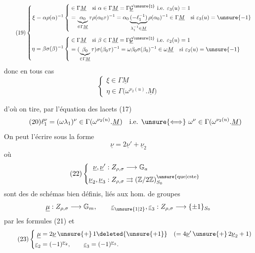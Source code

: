 \[
\tag{19}
\left\{
\begin{aligned}
\xi=\alpha\rho(\alpha)^{-1}
&\left\{
\begin{aligned}
&\in\Gamma\underline M\quad\text{si }\alpha\in\Gamma\underline M=\Gamma\underline{\mathcal G}^{\unsure{\natural}}\ \text{i.e. }\varepsilon_3(u)=1\\
&=\underbrace{\alpha_0}_{\in\Gamma\underline M}\tau\rho(\alpha_0\tau)^{-1}
=\alpha_0\underbrace{(-\ell_1^{-1})}_{\lambda_1^{-1}\in\underline M}\rho(\alpha_0)^{-1}\in\Gamma\underline M\quad\text{si }\varepsilon_3(u)=\unsure{-1}
\end{aligned}\right.\\[1ex]
\eta=\beta\sigma(\beta)^{-1}
&\left\{
\begin{aligned}
&\in\Gamma\underline M\quad\text{si }\beta\in\Gamma\underline M=\Gamma\underline{\mathcal G}^{\unsure{\natural}}\ \text{i.e. }\varepsilon_2(u)=1\\
&=(\underbrace{\beta_0}_{\in\Gamma\underline M}\tau)\sigma(\beta_0\tau)^{-1}
=\omega\beta_0\sigma(\beta_0)^{-1}\in\omega\underline M\quad\text{si }\varepsilon_2(u)=\unsure{-1}
\end{aligned}\right.
\end{aligned}\right.
\]
donc en tous cas
\[
\tag{19 bis}
\begin{cases}
\xi\in\Gamma\underline M\\
\eta\in\Gamma\bigl(\omega^{\nu_2(u)}.\underline{M}\bigr)
\end{cases}
\]

d'où on tire, par l'équation des lacets (17)
\[
\tag{20}
\ell_1^{\nu}=(\omega\lambda_1)^{\nu}\in\Gamma(\omega^{\nu_2(u)}.\underline M)
\quad\text{i.e. }\unsure{\Longleftrightarrow}\ \omega^{\nu}\in\Gamma(\omega^{\nu_2(u)}.\underline M)
\]
On peut l'écrire sous la forme
\[
\tag{21}
\underline\nu=2\underline\nu'+\underline\nu_2
\]
où
\[
\tag{22}
\left\{
\begin{aligned}
\underline\nu,\underline\nu' &: Z_{\rho,\sigma}\longrightarrow\mathbb G_a\\
\underline\nu_2,\underline\nu_3 &: Z_{\rho,\sigma}\rightrightarrows
(\mathbb Z/2\mathbb Z)_{S_0}^{\unsure{\mathrm{que}|\mathrm{cste}}}
\end{aligned}\right.
\]
\deleted{$\unsure{\varepsilon}$}
sont des  de schémas bien définis, liés  aux hom. de groupes \deleted{$\unsure{\mu}$}
\[
\underline\mu:Z_{\rho,\sigma}\longrightarrow\mathbb G_m,\qquad
\underline\varepsilon_{\unsure{1|2}},\underline\varepsilon_3:Z_{\rho,\sigma}\longrightarrow\{\pm1\}_{S_0}
\]
par les formules (21) et
\[
\tag{23}
\left\{
\begin{aligned}
\underline\mu&=2\underline\nu\,\unsure{+}\,1\deleted{\unsure{+1}}
\quad(=4\underline\nu'\,\unsure{+}\,2\underline\nu_2+1)\\
\underline\varepsilon_2&=(-1)^{\underline\nu_2},\qquad
\underline\varepsilon_3=(-1)^{\underline\nu_3}.
\end{aligned}\right.
\]

